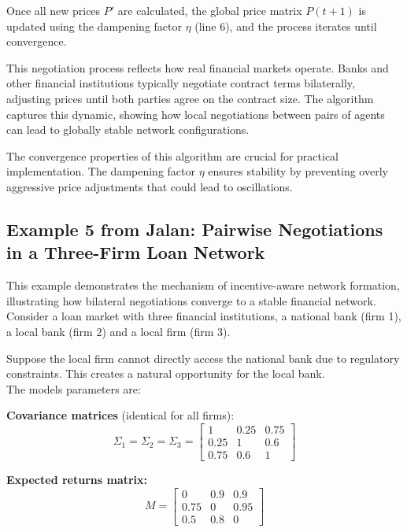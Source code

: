 Once all new prices $P'$ are calculated, the global price matrix $P(t+1)$ is updated using the dampening factor $\eta$ (line 6), and the process iterates until convergence.

This negotiation process reflects how real financial markets operate. Banks and other financial institutions typically negotiate contract terms bilaterally, adjusting prices until both parties agree on the contract size. The algorithm captures this dynamic, showing how local negotiations between pairs of agents can lead to globally stable network configurations.

The convergence properties of this algorithm are crucial for practical implementation. The dampening factor $\eta$ ensures stability by preventing overly aggressive price adjustments that could lead to oscillations.

\subsection{Example 5 from Jalan: Pairwise Negotiations in a Three-Firm Loan Network} \label{sec:example5}
This example demonstrates the mechanism of incentive-aware network formation, illustrating how bilateral negotiations converge to a stable financial network. \\


Consider a loan market with three financial institutions, a national bank (firm 1), a local bank (firm 2) and a local firm (firm 3).

Suppose the local firm cannot directly access the national bank due to regulatory constraints. This creates a natural opportunity for the local bank. \\

The models parameters are:

\textbf{Covariance matrices} (identical for all firms):
\begin{equation}
    \Sigma_1 = \Sigma_2 = \Sigma_3 = \begin{bmatrix} 
        1 & 0.25 & 0.75 \\ 
        0.25 & 1 & 0.6 \\ 
        0.75 & 0.6 & 1 
    \end{bmatrix}
\end{equation}

\textbf{Expected returns matrix:}
\begin{equation}
    M = \begin{bmatrix} 
        0 & 0.9 & 0.9 \\ 
        0.75 & 0 & 0.95 \\ 
        0.5 & 0.8 & 0 
    \end{bmatrix}
\end{equation}

